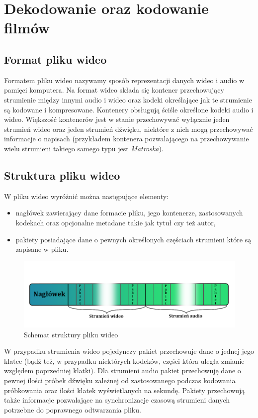 \documentclass[twoside]{projektInzynierskiMS}
\begin{document}
\section{Dekodowanie oraz kodowanie filmów}

\subsection{Format pliku wideo}
Formatem pliku wideo nazywamy sposób reprezentacji danych wideo i audio w pamięci komputera. Na format wideo składa się kontener przechowujący strumienie między innymi audio i wideo oraz kodeki określające jak te strumienie są kodowane i kompresowane. Kontenery obsługują ściśle określone kodeki audio i wideo. Większość kontenerów jest w stanie przechowywać wyłącznie jeden strumień wideo oraz jeden strumień dźwięku, niektóre z nich mogą przechowywać informacje o napisach (przykładem kontenera pozwalającego na przechowywanie wielu strumieni takiego samego typu jest \emph{Matroska}).

\subsection{Struktura pliku wideo}
W pliku wideo wyróżnić można następujące elementy: 
\begin{itemize}
	\item nagłówek zawierający dane formacie pliku, jego kontenerze, zastosowanych kodekach oraz opcjonalne metadane takie jak tytuł czy też autor,
	\item pakiety posiadające dane o pewnych określonych częściach strumieni które są zapisane w pliku.
\end{itemize}
\begin{figure}[h]
	\centering
	\includegraphics[width=13cm]{file_struct.png}
	\caption{Schemat struktury pliku wideo}
\end{figure}

W przypadku strumienia wideo pojedynczy pakiet przechowuje dane o jednej jego klatce (bądź też, w przypadku niektórych kodeków, części która uległa zmianie względem poprzedniej klatki). Dla strumieni audio pakiet przechowuję dane o pewnej ilości próbek dźwięku zależnej od zastosowanego podczas kodowania próbkowania oraz ilości klatek wyświetlanych na sekundę. Pakiety przechowują także informacje pozwalające na synchronizacje czasową strumieni danych potrzebne do poprawnego odtwarzania pliku.
\end{document}
